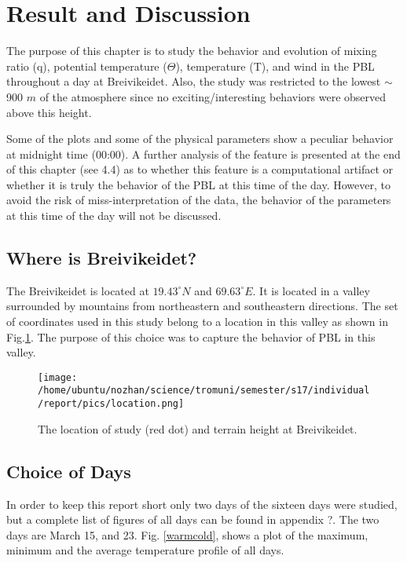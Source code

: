 \documentclass[a4paper,12pt]{article}
\numberwithin{equation}{section} %
\begin{document}
\newpage

\section{Result and Discussion}

The purpose of this chapter is to study the behavior and evolution of mixing ratio (q), potential temperature ($\Theta$), temperature (T), and wind in the PBL throughout a day at Breivikeidet. Also, the study was restricted to the lowest $\sim$ 900 $m$ of the atmosphere since no exciting/interesting behaviors were observed above this height.

Some of the plots and some of the physical parameters show a peculiar behavior at midnight time (00:00). A further analysis of the feature is presented at the end of this chapter (see 4.4) as to whether this feature is a computational artifact or whether it is truly the behavior of the PBL at this time of the day. However, to avoid the risk of miss-interpretation of the data, the behavior of the parameters at this time of the day will not be discussed.

\subsection{Where is Breivikeidet?}

The Breivikeidet is located at $19.43^\circ N$ and $69.63^\circ E$. It is located in a valley surrounded by mountains from northeastern and southeastern directions. The set of coordinates used in this study belong to a location in this valley as shown in Fig.\ref{location}. The purpose of this choice was to capture the behavior of PBL in this valley.

\begin{figure}[bhp]
\texttt{[image: /home/ubuntu/nozhan/science/tromuni/semester/s17/individual/report/pics/location.png]}
\caption{The location of study (red dot) and terrain height at Breivikeidet.}
\label{location}
\end{figure}

\subsection{Choice of Days}
In order to keep this report short only two days of the sixteen days were studied, but a complete list of figures of all days can be found in appendix ?. The two days are March 15, and 23. Fig. \ref{warmcold}, shows a plot of the maximum, minimum and the average temperature profile of all days.
\end{document}
